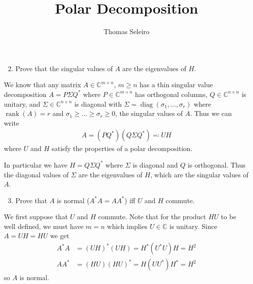 \documentclass[10pt, A4paper]{article}
\newcommand{\mxn}{m \times n}
\newcommand{\nxn}{n \times n}
\DeclareMathOperator{\diag}{diag}
\DeclareMathOperator{\rank}{rank}
\begin{document}
\title{Polar Decomposition}
\author{Thomas Seleiro}
\maketitle


\begin{enumerate}
	\setcounter{enumi}{1}
	\item Prove that the singular values of $A$ are the eigenvalues of $H$.
\end{enumerate}

We know that any matrix $A\in\mathbb{C}^{\mxn}$, $m\geq n$ has 
a thin singular value decomposition $A = P \Sigma Q^*$ where $P \in
\mathbb{C}^{\mxn}$ has orthogonal columns, $Q \in 
\mathbb{C}^{\nxn}$ is unitary, and $\Sigma \in 
\mathbb{C}^{\nxn}$ is diagonal with $\Sigma = \diag(\sigma_1, 
\ldots, \sigma_r)$ where $\rank(A) = r$ and $\sigma_1 \geq \ldots \geq
\sigma_r \geq 0$, the singular values of $A$. Thus we can write
\begin{align}
	A = (PQ^*) (Q \Sigma Q^*) \eqqcolon UH
	\label{eq:PolarSVD}
\end{align}
where $U$ and $H$ satisfy the properties of a polar decomposition.

In particular we have $H = Q \Sigma Q^*$ where $\Sigma$ is diagonal and 
$Q$ is orthogonal. Thus the diagonal values of $\Sigma$ are the 
eigenvalues of $H$, which are the singular values of $A$.





\vspace{0.2cm}
\begin{enumerate}
	\setcounter{enumi}{2}
	\item Prove that $A$ is normal ($A^*A = AA^*$) iff $U$ and $H$
	commute.
\end{enumerate}

We first suppose that $U$ and $H$ commute. Note that for the product
$HU$ to be well defined, we must have $m = n$ which implies
$U\in\mathbb{C}$ is unitary. Since $A = UH = HU$ we get
\begin{align}
	\label{eq:AstarA}
	A^*A &= (UH)^* (UH) = H^*(U^*U)H = H^2 \\
	AA^* &= (HU) (HU)^* = H(UU^*)H^* = H^2
\end{align}
so $A$ is normal.
\end{document}
